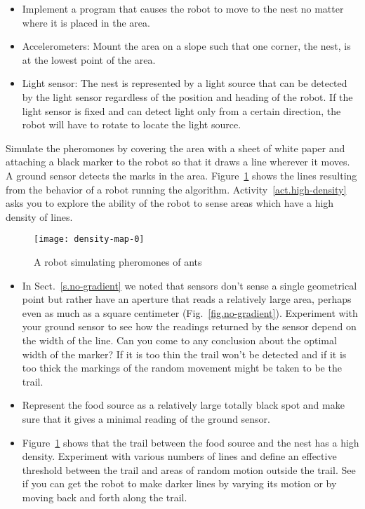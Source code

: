\begin{framed}
\begin{itemize}
\item Implement a program that causes the robot to move to the nest no matter where it is placed in the area.
\item Accelerometers: Mount the area on a slope such that one corner, the nest, is at the lowest point of the area. 
\item Light sensor: The nest is represented by a light source that can be detected by the light sensor regardless of the position and heading of the robot. If the light sensor is fixed and can detect light only from a certain direction, the robot will have to rotate to locate the light source.
\end{itemize}
\end{framed}

Simulate the pheromones by covering the area with a sheet of white paper and attaching a black marker to the robot so that it draws a line wherever it moves. A ground sensor detects the marks in the area. Figure~\ref{fig.ant-result} shows the lines resulting from the behavior of a robot running the algorithm. Activity~\ref{act.high-density} asks you to explore the ability of the robot to sense areas which have a high density of lines.

\begin{figure}
\begin{center}
\texttt{[image: density-map-0]}
\end{center}
\caption{A robot simulating pheromones of ants}\label{fig.ant-result}
\end{figure}

\begin{framed}
\begin{itemize}
\item In Sect.~\ref{s.no-gradient} we noted that sensors don't sense a single geometrical point but rather have an aperture that reads a relatively large area, perhaps even as much as a square centimeter (Fig.~\ref{fig.no-gradient}). Experiment with your ground sensor to see how the readings returned by the sensor depend on the width of the line. Can you come to any conclusion about the optimal width of the marker? If it is too thin the trail won't be detected and if it is too thick the markings of the random movement might be taken to be the trail.
\item Represent the food source as a relatively large totally black spot and make sure that it gives a minimal reading of the ground sensor.
\item Figure~\ref{fig.ant-result} shows that the trail between the food source and the nest has a high density. Experiment with various numbers of lines and define an effective threshold between the trail and areas of random motion outside the trail. See if you can get the robot to make darker lines by varying its motion or by moving back and forth along the trail.
\end{itemize}
\end{framed}

